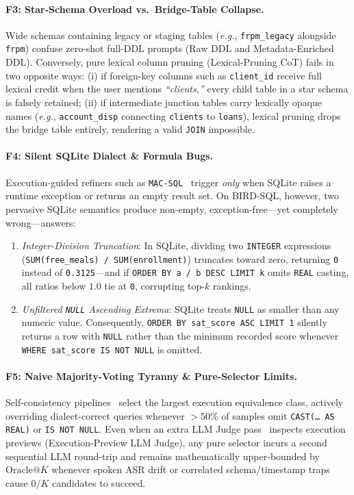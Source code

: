 \documentclass[10pt,twocolumn]{article}
\begin{document}
\paragraph{F3: Star-Schema Overload vs.\ Bridge-Table Collapse.}
Wide schemas containing legacy or staging tables (\emph{e.g.}, \texttt{frpm\_legacy} alongside \texttt{frpm}) confuse zero-shot full-DDL prompts (Raw DDL and Metadata-Enriched DDL). Conversely, pure lexical column pruning (Lexical-Pruning CoT) fails in two opposite ways: (i) if foreign-key columns such as \texttt{client\_id} receive full lexical credit when the user mentions \emph{``clients,''} every child table in a star schema is falsely retained; (ii) if intermediate junction tables carry lexically opaque names (\emph{e.g.}, \texttt{account\_disp} connecting \texttt{clients} to \texttt{loans}), lexical pruning drops the bridge table entirely, rendering a valid \texttt{JOIN} impossible.

\paragraph{F4: Silent SQLite Dialect \& Formula Bugs.}
Execution-guided refiners such as \texttt{MAC-SQL}~\cite{wang2025macsql} trigger \emph{only} when SQLite raises a runtime exception or returns an empty result set. On BIRD-SQL, however, two pervasive SQLite semantics produce non-empty, exception-free—yet completely wrong—answers:
\begin{enumerate}
  \item \emph{Integer-Division Truncation}: In SQLite, dividing two \texttt{INTEGER} expressions (\texttt{SUM(free\_meals) / SUM(enrollment)}) truncates toward zero, returning \texttt{0} instead of \texttt{0.3125}—and if \texttt{ORDER BY a / b DESC LIMIT k} omits \texttt{REAL} casting, all ratios below $1.0$ tie at \texttt{0}, corrupting top-$k$ rankings.
  \item \emph{Unfiltered \texttt{NULL} Ascending Extrema}: SQLite treats \texttt{NULL} as smaller than any numeric value. Consequently, \texttt{ORDER BY sat\_score ASC LIMIT 1} silently returns a row with \texttt{NULL} rather than the minimum recorded score whenever \texttt{WHERE sat\_score IS NOT NULL} is omitted.
\end{enumerate}

\paragraph{F5: Naive Majority-Voting Tyranny \& Pure-Selector Limits.}
Self-consistency pipelines~\cite{wang2023selfconsistency} select the largest execution equivalence class, actively overriding dialect-correct queries whenever $>50\%$ of samples omit \texttt{CAST(\dots\ AS REAL)} or \texttt{IS NOT NULL}. Even when an extra LLM Judge pass~\cite{lee2025mcssql,talaei2024chess} inspects execution previews (Execution-Preview LLM Judge), any pure selector incurs a second sequential LLM round-trip and remains mathematically upper-bounded by $\text{Oracle}@K$ whenever spoken ASR drift or correlated schema/timestamp traps cause $0/K$ candidates to succeed.
\end{document}
